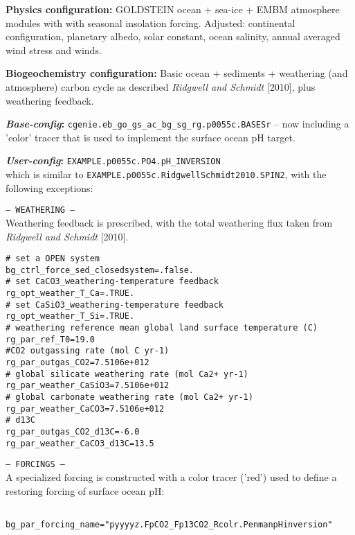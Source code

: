 \documentclass[10pt,twoside]{article}
\begin{document}
\noindent \textbf{Physics configuration:} GOLDSTEIN ocean + sea-ice + EMBM atmosphere modules with with seasonal insolation forcing. Adjusted: continental configuration, planetary albedo, solar constant, ocean salinity, annual averaged wind stress and winds.

\noindent \textbf{Biogeochemistry configuration:} Basic ocean + sediments + weathering (and atmosphere) carbon cycle as described \textit{Ridgwell and Schmidt} [2010], plus weathering feedback.

\noindent \textbf{\textit{Base-config}:} \texttt{cgenie.eb\_go\_gs\_ac\_bg\_sg\_rg.p0055c.BASESr} -- now including a 'color' tracer that is used to implement the surface ocean pH target.

\noindent \textbf{\textit{User-config}:} \texttt{EXAMPLE.p0055c.PO4.pH\_INVERSION} 
\\ which is similar to \texttt{EXAMPLE.p0055c.RidgwellSchmidt2010.SPIN2}, with the following exceptions:

\begin{compactitem}
        \item \texttt{--- WEATHERING ---}
        \\ Weathering feedback is prescribed, with the total weathering flux taken from \textit{Ridgwell and Schmidt} [2010].
        \vspace{-5pt}\begin{verbatim}
# set a OPEN system
bg_ctrl_force_sed_closedsystem=.false.
# set CaCO3_weathering-temperature feedback
rg_opt_weather_T_Ca=.TRUE.
# set CaSiO3_weathering-temperature feedback
rg_opt_weather_T_Si=.TRUE.
# weathering reference mean global land surface temperature (C)
rg_par_ref_T0=19.0
#CO2 outgassing rate (mol C yr-1)
rg_par_outgas_CO2=7.5106e+012
# global silicate weathering rate (mol Ca2+ yr-1)
rg_par_weather_CaSiO3=7.5106e+012
# global carbonate weathering rate (mol Ca2+ yr-1)
rg_par_weather_CaCO3=7.5106e+012
# d13C
rg_par_outgas_CO2_d13C=-6.0
rg_par_weather_CaCO3_d13C=13.5
        \end{verbatim}\vspace{-5pt}
        \item \texttt{--- FORCINGS ---}
        \\ A specialized forcing is constructed with a color tracer ('red') used to define a restoring forcing of surface ocean pH:
        \vspace{-5pt}\begin{verbatim}
        bg_par_forcing_name="pyyyyz.FpCO2_Fp13CO2_Rcolr.PenmanpHinversion"
        \end{verbatim}\vspace{-5pt}
        \end{compactitem}
\end{document}
